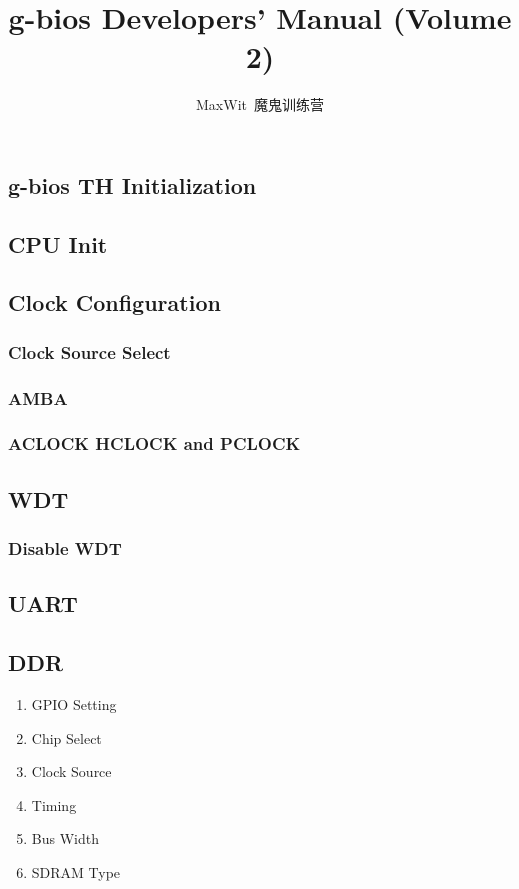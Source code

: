 \documentclass[a4paper,11pt]{book}
\title{g-bios Developers' Manual (Volume 2)}
\author{MaxWit~魔鬼训练营}
\begin{document}
\begin{CJK*}{UTF8}{gbsn}
\CJKtilde
\maketitle
\tableofcontents

\chapter{g-bios TH Initialization}

\section{CPU Init}

\section{Clock Configuration}
\subsection{Clock Source Select}
\subsection{AMBA}
\subsection{ACLOCK HCLOCK and PCLOCK}

\section{WDT}
\subsection{Disable WDT}

\section{UART}

\section{DDR}
\begin{enumerate}
\item GPIO Setting
\item Chip Select
\item Clock Source
\item Timing
\item Bus Width
\item SDRAM Type
\end{enumerate}


\end{CJK*}
\end{document}
